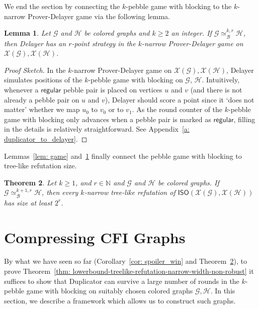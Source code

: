 \documentclass[10pt,a4paper]{article}
\newcommand{\regular}{\mathsf{regular}}
\newcommand{\graphG}{\mathcal{G}}
\newcommand{\graphH}{\mathcal{H}}
\newcommand{\graphXG}{\mathcal{X}(\mathcal{G})}
\newcommand{\graphXH}{\mathcal{X}(\mathcal{H})}
\newcommand{\XISO}{\mathsf{ISO}(\graphXG, \graphXH)}
\newcommand{\kbequivr}[2]{\simeq_{\mathcal{B}}^{#1,#2}}
\newtheorem{theorem}{Theorem}
\newtheorem{lemma}[theorem]{Lemma}
\newcommand{\ifAppendix}[1]{#1}
\begin{document}
We end the section by connecting the $k$-pebble game with blocking to the $k$-narrow Prover-Delayer game via the following lemma.
%

\begin{lemma}
        \label{lem:duplicator-blocking-to-delayer}
        Let $\graphG$ and $\graphH$ be colored graphs
        and $k\geq 2$ an integer. If $\graphG \kbequivr{k}{r} \graphH$, then Delayer has an $r$-point strategy in the $k$-narrow Prover-Delayer game on $\graphXG, \graphXH$.
\end{lemma}

	\begin{proof}[Proof Sketch]
\noindent In the $k$-narrow Prover-Delayer game on $\graphXG,\graphXH$,
Delayer  
simulates positions of the $k$-pebble game with blocking on $\graphG$, $\graphH$.
Intuitively, whenever a $\regular$ pebble pair is placed on vertices $u$ and $v$
(and there is not already a pebble pair on $u$ and $v$),
Delayer should score a point 
%
since it `does not matter' whether we map $u_0$ to $v_0$ or to $v_1$. As the round counter of the $k$-pebble game with blocking only advances when a pebble pair is marked as $\regular$, filling in the details is relatively straightforward. \ifAppendix{See Appendix~\ref{a: duplicator_to_delayer}.}
\end{proof}

\noindent Lemmas~\ref{lem: game} and~\ref{lem:duplicator-blocking-to-delayer} finally connect the pebble game with blocking to tree-like refutation size. 


\begin{theorem} \label{cor: block_to_lb}
Let  $k \ge 1$, and $r \in \mathbb{N}$ and $\graphG$ and $\graphH$ be colored graphs.
If $\graphG \kbequivr{k+1}{r} \graphH$, then every $k$-narrow tree-like refutation of $\XISO$ has size at least $2^r$.
\end{theorem}

         
 \section{Compressing CFI Graphs}\label{sec:compressing-cfi}




By what we have seen so far (Corollary~\ref{cor: spoiler_win} and Theorem~\ref{cor: block_to_lb}), to prove Theorem~\ref{thm: lowerbound-treelike-refutation-narrow-width-non-robust} it suffices to show that Duplicator can survive a large number of rounds in the $k$-pebble game with blocking on suitably chosen colored graphs $\graphG, \graphH$. In this section, we describe a framework which allows us to construct such graphs.
\end{document}
